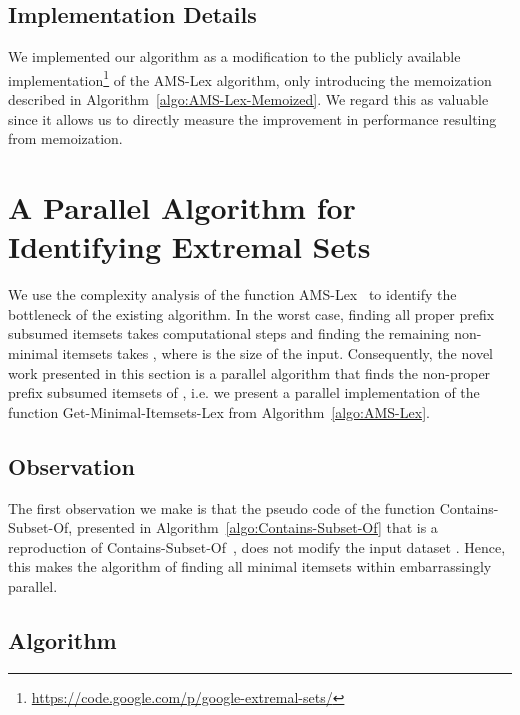 \documentclass[13pt,a4paper]{article}
\begin{document}
\subsection{Implementation Details}
\label{ImplDetails}
We implemented our algorithm as a modification to the publicly available implementation\footnote{\url{https://code.google.com/p/google-extremal-sets/}} of the AMS-Lex algorithm, only introducing
the memoization described in Algorithm~\ref{algo:AMS-Lex-Memoized}. We regard this as valuable since it allows us to directly measure the improvement in performance resulting from memoization.


\section{A Parallel Algorithm for Identifying Extremal Sets}
\label{sec:parallel}

We use the complexity analysis of the function AMS-Lex~\cite{BayardoPanda11} to identify the bottleneck of the existing algorithm. In the worst case, finding all proper prefix subsumed itemsets takes  computational steps and finding the remaining non-minimal itemsets takes , where  is the size of the input. Consequently, the novel work presented in this section is a parallel algorithm that finds the non-proper prefix subsumed itemsets of , i.e. we present a parallel implementation of the function Get-Minimal-Itemsets-Lex from Algorithm~\ref{algo:AMS-Lex}.

\subsection{Observation}
The first observation we make is that the pseudo code of the function Contains-Subset-Of, presented in Algorithm~\ref{algo:Contains-Subset-Of} that is a reproduction of Contains-Subset-Of~\cite{BayardoPanda11}, does not modify the input dataset . Hence, this makes the algorithm of finding all minimal itemsets within  embarrassingly parallel.



\subsection{Algorithm}
\end{document}
